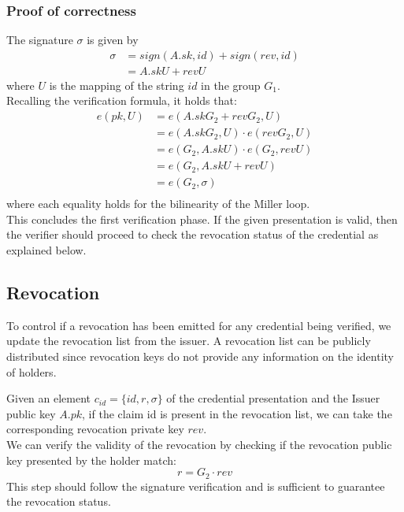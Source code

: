 \subsubsection{Proof of correctness}
The signature $\sigma$ is given by
\begin{equation*}
\begin{split}
    \sigma &= sign(A.sk, id) + sign(rev, id) \\
     &= A.sk U + rev U
\end{split}
\end{equation*}
where $U$ is the mapping of the string $id$ in the group $G_1$.\\
Recalling the verification formula, it holds that:
\begin{equation*}
\begin{split}
 e(pk, U) &= e(A.skG_2 + revG_2, U) \\
 &= e(A.skG_2, U) \cdot e(revG_2, U) \\
 &= e(G_2, A.sk U) \cdot e(G_2, rev U) \\
 &= e(G_2, A.sk U + rev U) \\
 &= e(G_2, \sigma) \\
\end{split}
\end{equation*}
where each equality holds for the bilinearity of the Miller loop.\\

This concludes the first verification phase. If the given presentation
is valid, then the verifier should proceed to check the revocation
status of the credential as explained below.

\subsection{Revocation}

To control if a revocation has been emitted for any credential being
verified, we update the revocation list from the issuer. A revocation
list can be publicly distributed since revocation keys do not provide
any information on the identity of holders.

Given an element $c_{id} = \{id, r, \sigma \}$ of the credential
presentation and the Issuer public key $A.pk$, if the claim id is
present in the revocation list, we can take the corresponding
revocation private key $rev$.\\ We can verify the validity of the
revocation by checking if the revocation public key presented by the
holder match:
\begin{equation*}
    r = G_2 \cdot rev
\end{equation*}
This step should follow the signature verification and is sufficient
to guarantee the revocation status.

